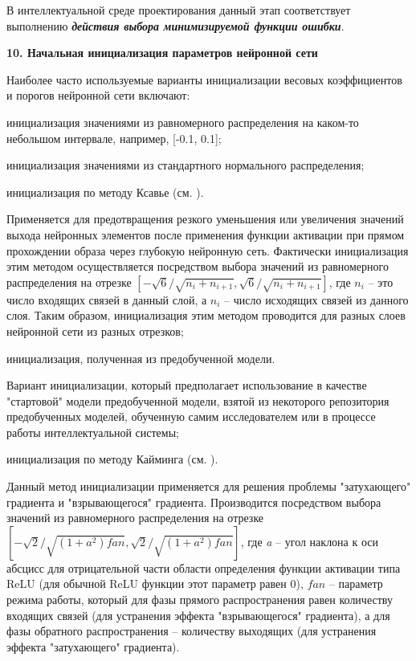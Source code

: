В интеллектуальной среде проектирования данный этап соответствует выполнению \textbf{\textit{действия выбора минимизируемой функции ошибки}}.


\textbf{10. Начальная инициализация параметров нейронной сети}

Наиболее часто используемые варианты инициализации весовых коэффициентов и порогов нейронной сети включают:
\begin{textitemize}
	\item инициализация значениями из равномерного распределения на каком-то небольшом интервале, например, [-0.1, 0.1];
	\item инициализация значениями из стандартного нормального распределения;
	\item инициализация по методу Ксавье (см. ).

	Применяется для предотвращения резкого уменьшения или увеличения значений выхода нейронных элементов после применения функции активации при прямом прохождении образа через глубокую нейронную сеть. Фактически инициализация этим методом осуществляется посредством выбора значений из равномерного распределения на отрезке $[- \sqrt{6} / \sqrt{n_i+n_{i+1}}, \sqrt{6} / \sqrt{n_i+n_{i+1}}]$, где $n_i$ -- это число входящих связей в данный слой, а $n_i$ -- число исходящих связей из данного слоя. Таким образом, инициализация этим методом проводится для разных слоев нейронной сети из разных отрезков;

	\item инициализация, полученная из предобученной модели.

	Вариант инициализации, который предполагает использование в качестве "стартовой"{} модели предобученной модели, взятой из некоторого репозитория предобученных моделей, обученную самим исследователем или в процессе работы интеллектуальной системы;

	\item инициализация по методу Кайминга (см. ).

	Данный метод инициализации применяется для решения проблемы "затухающего"{} градиента и "взрывающегося"{}
	градиента. Производится посредством выбора значений из равномерного распределения на отрезке $[-\sqrt{2} / \sqrt{(1+a^2)fan}, \sqrt{2} / \sqrt{(1+a^2)fan}]$,
	где \textit{a} -- угол наклона к оси абсцисс для отрицательной части области определения функции активации типа ReLU (для обычной ReLU функции этот параметр равен 0), $fan$ -- параметр режима работы, который для фазы прямого распространения равен количеству входящих связей (для устранения эффекта "взрывающегося"{} градиента), а для фазы обратного распространения -- количеству выходящих (для устранения эффекта "затухающего"{} градиента).
\end{textitemize}

